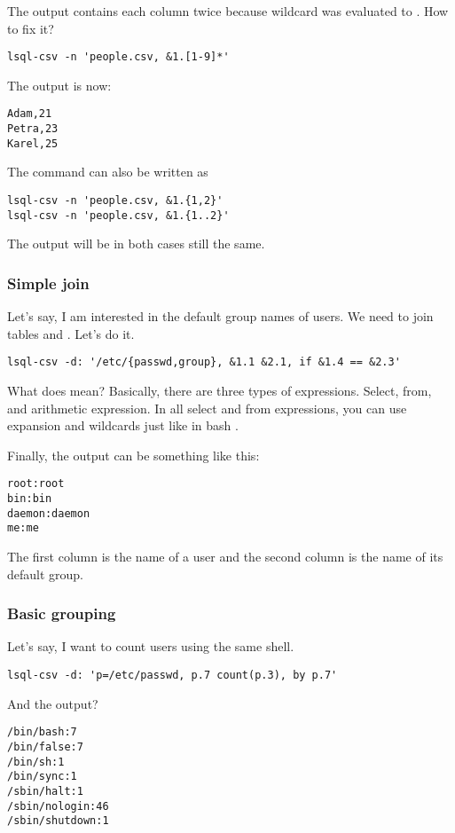 The output contains each column twice because wildcard  was evaluated to .
How to fix it?
\begin{verbatim}
lsql-csv -n 'people.csv, &1.[1-9]*'
\end{verbatim}
The output is now:
\begin{verbatim}
Adam,21
Petra,23
Karel,25
\end{verbatim}

The command can also be written as
\begin{verbatim}
lsql-csv -n 'people.csv, &1.{1,2}'
lsql-csv -n 'people.csv, &1.{1..2}'
\end{verbatim}
The output will be in both cases still the same.


\subsubsection{Simple join}
Let's say, I am interested in the default group names of users. We need to join tables  and . Let's do it.
\begin{verbatim}
lsql-csv -d: '/etc/{passwd,group}, &1.1 &2.1, if &1.4 == &2.3'
\end{verbatim}
What does  mean? Basically, there are three types of expressions. Select, from, and arithmetic expression. In all select and from expressions, you can use expansion and wildcards just like in bash \cite{bash-reference-manual}.

Finally, the output can be something like this:
\begin{verbatim}
root:root
bin:bin
daemon:daemon
me:me
\end{verbatim}
The first column is the name of a user and the second column is the name of its default group.


\subsubsection{Basic grouping}
Let's say, I want to count users using the same shell.
\begin{verbatim}
lsql-csv -d: 'p=/etc/passwd, p.7 count(p.3), by p.7'
\end{verbatim}
And the output?
\begin{verbatim}
/bin/bash:7
/bin/false:7
/bin/sh:1
/bin/sync:1
/sbin/halt:1
/sbin/nologin:46
/sbin/shutdown:1
\end{verbatim}

